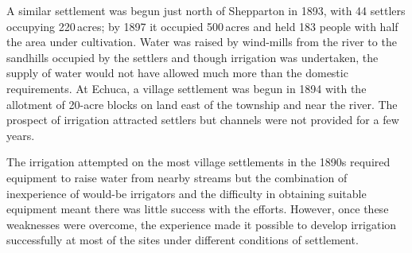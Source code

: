 A similar settlement was begun just north of Shepparton
 in 1893, with 44 settlers occupying
220\,acres; by 1897 it occupied 500\,acres and held 183 people with
half the area under cultivation.  Water was raised by
wind-mills from the river to the sandhills
occupied by the settlers and though irrigation was undertaken, the
supply of water would not have allowed much more than the domestic
requirements.  At Echuca,  a village settlement
was begun in 1894 with the allotment of 20-acre blocks on land east of
the township and near the river.  The prospect of irrigation attracted
settlers but channels were not provided for
a few years.

\closure
The irrigation attempted on the most village settlements in the 1890s
required equipment to raise water from nearby streams but the
combination of inexperience of would-be irrigators and the difficulty
in obtaining suitable equipment meant there was little success with
the efforts.  However, once these weaknesses were overcome, the
experience made it possible to develop irrigation successfully at most
of the sites under different conditions of settlement.


